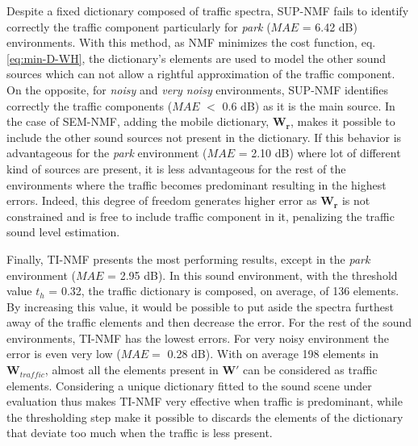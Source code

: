 \documentclass[review,5p,twocolumn,sort&compress,times]{elsarticle}
\begin{document}
Despite a fixed dictionary composed of traffic spectra, SUP-NMF fails to identify correctly the traffic component particularly for \textit{park} ($MAE$ = 6.42 dB) environments. With this method, as NMF minimizes the cost function, eq. \ref{eq:min-D-WH}, the dictionary's elements are used to model the other sound sources which can not allow a rightful approximation of the traffic component. On the opposite, for \textit{noisy} and \textit{very noisy} environments, SUP-NMF identifies correctly the traffic components ($MAE$ $<$ 0.6 dB) as it is the main source.
In the case of SEM-NMF, adding the mobile dictionary, $\mathbf{W_r}$, makes it possible to include the other sound sources not present in the dictionary. If this behavior is advantageous for the \textit{park} environment ($MAE$ = 2.10 dB) where lot of different kind of sources are present, it is less advantageous for the rest of the environments where the traffic becomes predominant resulting in the highest errors. Indeed, this degree of freedom generates higher error as $\mathbf{W_r}$ is not constrained and is free to include traffic component in it, penalizing the traffic sound level estimation.

Finally, TI-NMF presents the most performing results, except in the \textit{park} environment ($MAE$ = 2.95 dB). In this sound environment, with the threshold value $t_h$ = 0.32, the traffic dictionary is composed, on average, of 136 elements.
By increasing this value, it would be possible to put aside the spectra furthest away of the traffic elements and then decrease the error. For the rest of the sound environments, TI-NMF has the lowest errors. For very noisy environment the error is even very low ($MAE=$ 0.28 dB). With on average 198 elements in $\mathbf{W}_{traffic}$, almost all the elements present in $\mathbf{W'}$ can be considered as traffic elements. 
Considering a unique dictionary fitted to the sound scene under evaluation thus makes TI-NMF very effective when traffic is predominant, while the thresholding step make it possible to discards the elements of the dictionary that deviate too much when the traffic is less present.
\end{document}
